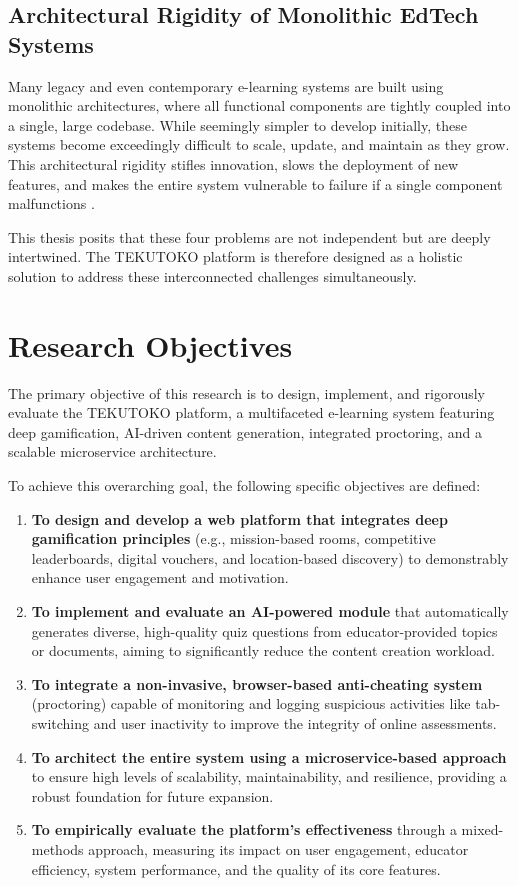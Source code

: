 \subsection{Architectural Rigidity of Monolithic EdTech Systems}
Many legacy and even contemporary e-learning systems are built using monolithic architectures, where all functional components are tightly coupled into a single, large codebase. While seemingly simpler to develop initially, these systems become exceedingly difficult to scale, update, and maintain as they grow. This architectural rigidity stifles innovation, slows the deployment of new features, and makes the entire system vulnerable to failure if a single component malfunctions \citep{newman2015}.

This thesis posits that these four problems are not independent but are deeply intertwined. The TEKUTOKO platform is therefore designed as a holistic solution to address these interconnected challenges simultaneously.

\section{Research Objectives}
\label{sec:intro_objectives}
The primary objective of this research is to design, implement, and rigorously evaluate the TEKUTOKO platform, a multifaceted e-learning system featuring deep gamification, AI-driven content generation, integrated proctoring, and a scalable microservice architecture.

To achieve this overarching goal, the following specific objectives are defined:
\begin{enumerate}
    \item \textbf{To design and develop a web platform that integrates deep gamification principles} (e.g., mission-based rooms, competitive leaderboards, digital vouchers, and location-based discovery) to demonstrably enhance user engagement and motivation.
    \item \textbf{To implement and evaluate an AI-powered module} that automatically generates diverse, high-quality quiz questions from educator-provided topics or documents, aiming to significantly reduce the content creation workload.
    \item \textbf{To integrate a non-invasive, browser-based anti-cheating system} (proctoring) capable of monitoring and logging suspicious activities like tab-switching and user inactivity to improve the integrity of online assessments.
    \item \textbf{To architect the entire system using a microservice-based approach} to ensure high levels of scalability, maintainability, and resilience, providing a robust foundation for future expansion.
    \item \textbf{To empirically evaluate the platform's effectiveness} through a mixed-methods approach, measuring its impact on user engagement, educator efficiency, system performance, and the quality of its core features.
\end{enumerate}

